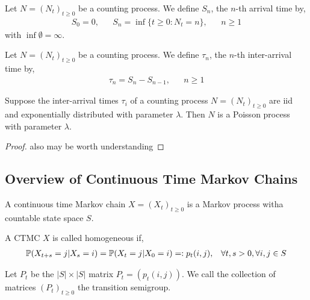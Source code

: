 \documentclass[12pt]{article}
\begin{document}
\begin{definition}
Let \( N = (N_t)_{t\geq 0} \) be a counting process. We define \( S_n \), the \( n \)-th arrival time by,
\begin{align*}
    S_0 = 0, && S_n = \inf\{t\geq 0 : N_t = n\}, && n\geq 1
\end{align*}
with \( \inf \emptyset = \infty \).
\end{definition}

\begin{definition}
Let \( N = (N_t)_{t\geq 0} \) be a counting process. We define \( \tau_n \), the \( n \)-th inter-arrival time by,
\begin{align*}
    \tau_n = S_n - S_{n-1}, && n\geq 1
\end{align*}
\end{definition}

\begin{theorem}
Suppose the inter-arrival times \( \tau_i \) of a counting process \( N = (N_t)_{t\geq 0} \) are iid and exponentially distributed with parameter \( \lambda \). Then \( N \) is a Poisson process with parameter \( \lambda \).
\end{theorem}

\begin{proof}
    also may be worth understanding
\end{proof}

\subsection{Overview of Continuous Time Markov Chains}

\begin{definition}
A continuous time Markov chain \( X = (X_t)_{t\geq 0} \) is a Markov process witha  countable state space \( S \).
\end{definition}

\begin{definition}[Homogeneous]
A CTMC \( X \) is called homogeneous if,
\begin{align*}
    \mathbb{P}(X_{t+s} = j | X_s = i) = \mathbb{P}(X_t = j | X_0 = i) =: p_t(i,j), && \forall t,s > 0, \forall i,j\in S
\end{align*}
\end{definition}

\begin{definition}
Let \( P_t \) be the \( |S|\times|S| \) matrix \( P_t = (p_t(i,j)) \). We call the collection of matrices \( (P_t)_{t\geq 0} \) the transition semigroup.
\end{definition}
\end{document}
